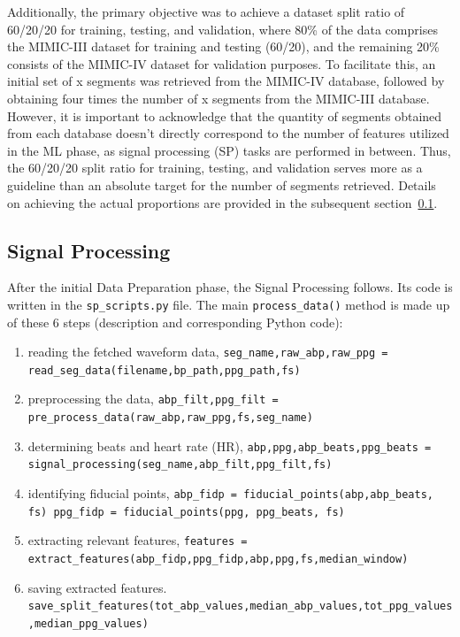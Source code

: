 Additionally, the primary objective was to achieve a dataset split ratio of 60/20/20 for training, testing, and validation, where 80\% of the data comprises the MIMIC-III dataset for training and testing (60/20), and the remaining 20\% consists of the MIMIC-IV dataset for validation purposes.
To facilitate this, an initial set of x segments was retrieved from the MIMIC-IV database, followed by obtaining four times the number of x segments from the MIMIC-III database.
However, it is important to acknowledge that the quantity of segments obtained from each database doesn't directly correspond to the number of features utilized in the ML phase, as signal processing (SP) tasks are performed in between.
Thus, the 60/20/20 split ratio for training, testing, and validation serves more as a guideline than an absolute target for the number of segments retrieved.
Details on achieving the actual proportions are provided in the subsequent section~\ref{subsec:sp_methods}.

\subsection{Signal Processing}
\label{subsec:sp_methods}

After the initial Data Preparation phase, the Signal Processing follows.
Its code is written in the \texttt{sp\_scripts.py} file.
The main \texttt{process\_data()} method is made up of these 6 steps (description and corresponding Python code):
\begin{enumerate}
    \item reading the fetched waveform data, \newline
    \small \texttt{seg\_name,raw\_abp,raw\_ppg = read\_seg\_data(filename,bp\_path,ppg\_path,fs)}
    \item \normalsize preprocessing the data, \newline
    \small \texttt{abp\_filt,ppg\_filt = pre\_process\_data(raw\_abp,raw\_ppg,fs,seg\_name)}
    \item \normalsize determining beats and heart rate (HR), \newline
    \small \texttt{abp,ppg,abp\_beats,ppg\_beats = signal\_processing(seg\_name,abp\_filt,ppg\_filt,fs)}
    \item \normalsize identifying fiducial points, \newline
    \small \texttt{abp\_fidp = fiducial\_points(abp,abp\_beats, fs) \newline ppg\_fidp = fiducial\_points(ppg, ppg\_beats, fs)}
    \item \normalsize extracting relevant features, \newline
    \small \texttt{features = extract\_features(abp\_fidp,ppg\_fidp,abp,ppg,fs,median\_window)}
    \item \normalsize saving extracted features. \newline
    \small \texttt{save\_split\_features(tot\_abp\_values,median\_abp\_values,tot\_ppg\_values,median\_ppg\_values)}
\end{enumerate}

